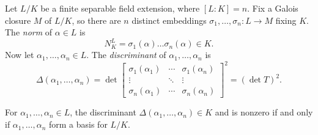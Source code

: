 \begin{definition}
  Let $L / K$ be a finite separable field extension,
  where $[L : K] = n$.
  Fix a Galois closure $M$ of $L / K$, so there are
  $n$ distinct embeddings
  $\sigma_1, \dots, \sigma_n : L \to M$ fixing $K$. The
  \emph{norm} of $\alpha \in L$ is
  \[
    N^L_{K} = \sigma_1(\alpha) \dots \sigma_n(\alpha) \in K.
  \]
  Now let $\alpha_1, \dots, \alpha_n \in L$.
  The \emph{discriminant} of $\alpha_1, \dots, \alpha_n$
  is
  \[
    \Delta(\alpha_1, \dots, \alpha_n) = \det
    \begin{bmatrix}
      \sigma_1(\alpha_1) & \cdots & \sigma_1(\alpha_n) \\
      \vdots & \ddots & \vdots \\
      \sigma_n(\alpha_1) & \cdots & \sigma_n(\alpha_n)
    \end{bmatrix}^2 = (\det T)^2.
  \]
\end{definition}

\begin{lemma}
  For $\alpha_1, \dots, \alpha_n \in L$,
  the discriminant
  $\Delta(\alpha_1, \dots, \alpha_n) \in K$
  and is nonzero if and
  only if $\alpha_1, \dots, \alpha_n$ form a basis
  for $L / K$.
\end{lemma}

